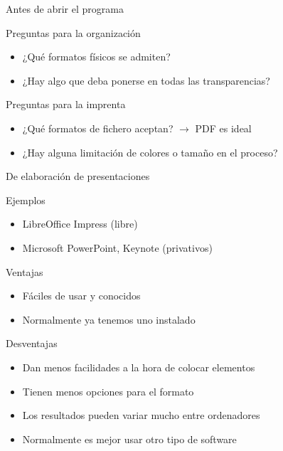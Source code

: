 \documentclass[xcolor=svgnames,compress]{beamer}
\begin{document}
\begin{frame}{Antes de abrir el programa}

  \begin{block}{Preguntas para la organización}
    \begin{itemize}
    \item ¿Qué formatos físicos se admiten?
    \item ¿Hay algo que deba ponerse en todas las transparencias?
    \end{itemize}
  \end{block}

  \begin{block}{Preguntas para la imprenta}
    \begin{itemize}
    \item ¿Qué formatos de fichero aceptan? $\rightarrow$ PDF es ideal
    \item ¿Hay alguna limitación de colores o tamaño en el proceso?
    \end{itemize}
  \end{block}
  
\end{frame}

\begin{frame}{De elaboración de presentaciones}

  \begin{block}{Ejemplos}
    \begin{itemize}
    \item LibreOffice Impress (libre)
    \item Microsoft PowerPoint, Keynote (privativos)
    \end{itemize}
  \end{block}

  \begin{block}{Ventajas}
    \begin{itemize}
    \item Fáciles de usar y conocidos
    \item Normalmente ya tenemos uno instalado
    \end{itemize}
  \end{block}

  \begin{block}{Desventajas}
    \begin{itemize}
    \item Dan menos facilidades a la hora de colocar elementos
    \item Tienen menos opciones para el formato
    \item Los resultados pueden variar mucho entre ordenadores
    \item Normalmente es mejor usar otro tipo de software
    \end{itemize}
  \end{block}

\end{frame}
\end{document}
